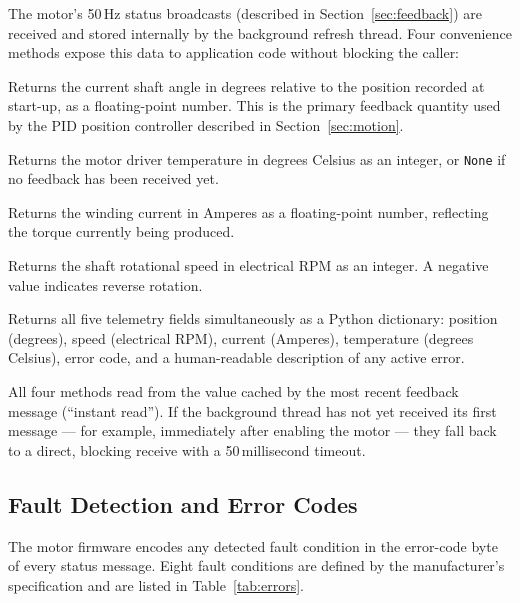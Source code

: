 \documentclass[12pt,a4paper]{article}
\begin{document}
The motor's 50\,Hz status broadcasts (described in
Section~\ref{sec:feedback}) are received and stored internally by the
background refresh thread. Four convenience methods expose this data
to application code without blocking the caller:

\begin{description}[leftmargin=4.8cm, style=nextline]
  \item[\texttt{get\_position()}]
    Returns the current shaft angle in degrees relative to the position
    recorded at start-up, as a floating-point number.  This is the primary
    feedback quantity used by the PID position controller described in
    Section~\ref{sec:motion}.

  \item[\texttt{get\_temperature()}]
    Returns the motor driver temperature in degrees Celsius as an integer,
    or \texttt{None} if no feedback has been received yet.

  \item[\texttt{get\_current()}]
    Returns the winding current in Amperes as a floating-point number,
    reflecting the torque currently being produced.

  \item[\texttt{get\_speed()}]
    Returns the shaft rotational speed in electrical RPM as an integer.
    A negative value indicates reverse rotation.

  \item[\texttt{get\_motor\_data()}]
    Returns all five telemetry fields simultaneously as a Python
    dictionary: position (degrees), speed (electrical RPM), current
    (Amperes), temperature (degrees Celsius), error code, and a
    human-readable description of any active error.
\end{description}

All four methods read from the value cached by the most recent feedback
message (``instant read'').  If the background thread has not yet received
its first message --- for example, immediately after enabling the motor ---
they fall back to a direct, blocking receive with a 50\,millisecond
timeout.

\subsection{Fault Detection and Error Codes}

The motor firmware encodes any detected fault condition in the error-code
byte of every status message.  Eight fault conditions are defined by the
manufacturer's specification and are listed in Table~\ref{tab:errors}.
\end{document}
